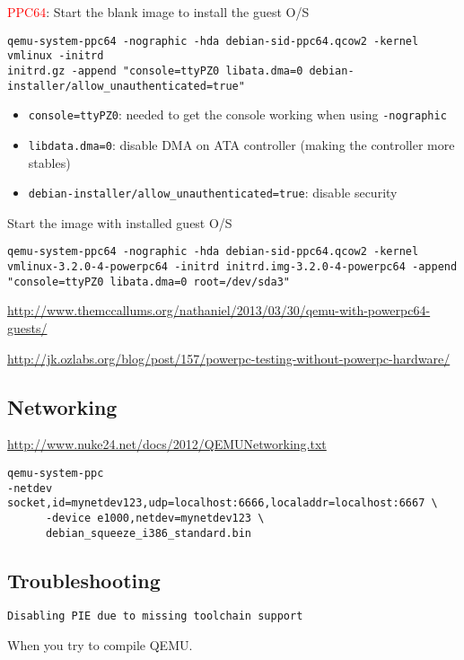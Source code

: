 \textcolor{red}{PPC64}:
Start the blank image to install the guest O/S
\begin{verbatim}
qemu-system-ppc64 -nographic -hda debian-sid-ppc64.qcow2 -kernel vmlinux -initrd
initrd.gz -append "console=ttyPZ0 libata.dma=0 debian-installer/allow_unauthenticated=true"
\end{verbatim}
\begin{itemize}
  \item \verb!console=ttyPZ0!: needed to get the console working when using
  \verb!-nographic!
  
  \item \verb!libdata.dma=0!: disable DMA on ATA controller (making the
  controller more stables)
  
  \item \verb!debian-installer/allow_unauthenticated=true!: disable security
\end{itemize}

Start the image with installed guest O/S
\begin{verbatim}
qemu-system-ppc64 -nographic -hda debian-sid-ppc64.qcow2 -kernel
vmlinux-3.2.0-4-powerpc64 -initrd initrd.img-3.2.0-4-powerpc64 -append "console=ttyPZ0 libata.dma=0 root=/dev/sda3"
\end{verbatim}
\url{http://www.themccallums.org/nathaniel/2013/03/30/qemu-with-powerpc64-guests/}

\url{http://jk.ozlabs.org/blog/post/157/powerpc-testing-without-powerpc-hardware/}

\subsection{Networking}

\url{http://www.nuke24.net/docs/2012/QEMUNetworking.txt}

\begin{verbatim}
qemu-system-ppc
-netdev socket,id=mynetdev123,udp=localhost:6666,localaddr=localhost:6667 \
	  -device e1000,netdev=mynetdev123 \
	  debian_squeeze_i386_standard.bin
\end{verbatim}

\subsection{Troubleshooting}
\label{sec:QEMU-troubleshooting}

\begin{verbatim}
Disabling PIE due to missing toolchain support
\end{verbatim}
When you try to compile QEMU. 



